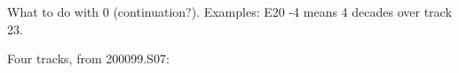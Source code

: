 \documentclass[letterpaper,10pt,english]{sphinxmanual}
\begin{document}
What to do with 0 (continuation?).
Examples: E20   -4\textendash{} means 4 decades over track 23.

Four tracks, from 200099.S07:

\begin{sphinxVerbatim}[commandchars=\\\{\}]
     
        
              


\end{sphinxVerbatim}
\end{document}

